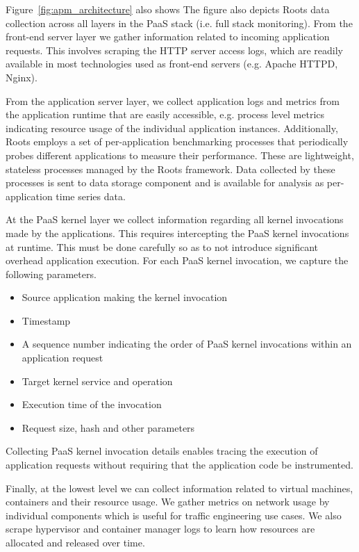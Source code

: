 Figure~\ref{fig:apm_architecture} also shows 
The figure also depicts Roots data collection across all layers in the 
PaaS stack (i.e. full stack monitoring). 
From the front-end server layer we gather information related to incoming application
requests. This involves scraping the HTTP server access logs, which are
readily available in most technologies used as front-end
servers (e.g. Apache HTTPD, Nginx). 

From the application server layer, we collect application logs and 
metrics from the application runtime that are easily accessible, e.g. process level
metrics indicating resource usage of the individual application instances. Additionally, Roots
employs a set of per-application benchmarking processes that periodically probes 
different applications
to measure their performance. These are lightweight, stateless processes managed by the Roots framework.
Data collected by these processes is sent to data storage component and is available
for analysis as per-application time series data. 

At the PaaS kernel layer we collect information regarding all kernel invocations
made by the applications. This requires intercepting the PaaS kernel invocations
at runtime. This must be done carefully so as to not introduce significant
overhead application execution. For each PaaS kernel invocation, we capture the 
following parameters.
\begin{itemize}
\item Source application making the kernel invocation
\item Timestamp
\item A sequence number indicating the order of PaaS kernel invocations within an application request
\item Target kernel service and operation
\item Execution time of the invocation
\item Request size, hash and other parameters
\end{itemize}
Collecting PaaS kernel invocation details enables tracing the execution of application 
requests without requiring that the application code be instrumented.

Finally, at the lowest level we can collect information related to virtual machines, containers
and their resource usage. We gather metrics on network usage by individual components which
is useful for traffic engineering use cases. 
We also scrape
hypervisor and container manager logs to learn how resources are allocated and released over time.

